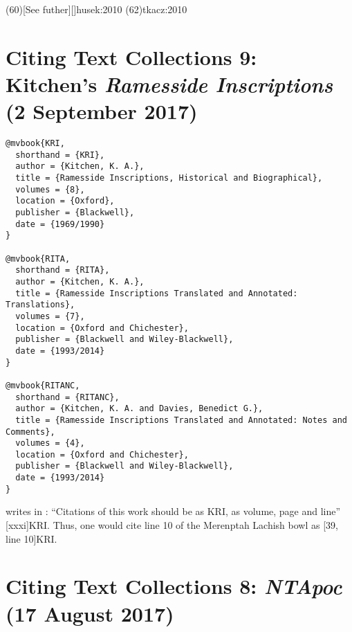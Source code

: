\documentclass[a4paper]{article}
\begin{document}
\examplecite(60)[See futher][]{husek:2010}
\examplecite(62){tkacz:2010}
\exampleabbreviations
\examplebibliography
{}

\section{Citing Text Collections 9: Kitchen’s \emph{Ramesside Inscriptions} (2 September 2017)}

\begin{verbatim}
@mvbook{KRI,
  shorthand = {KRI},
  author = {Kitchen, K. A.},
  title = {Ramesside Inscriptions, Historical and Biographical},
  volumes = {8},
  location = {Oxford},
  publisher = {Blackwell},
  date = {1969/1990}
}

@mvbook{RITA,
  shorthand = {RITA},
  author = {Kitchen, K. A.},
  title = {Ramesside Inscriptions Translated and Annotated: Translations},
  volumes = {7},
  location = {Oxford and Chichester},
  publisher = {Blackwell and Wiley-Blackwell},
  date = {1993/2014}
}

@mvbook{RITANC,
  shorthand = {RITANC},
  author = {Kitchen, K. A. and Davies, Benedict G.},
  title = {Ramesside Inscriptions Translated and Annotated: Notes and Comments},
  volumes = {4},
  location = {Oxford and Chichester},
  publisher = {Blackwell and Wiley-Blackwell},
  date = {1993/2014}
}
\end{verbatim}

\begin{verbcite}
   writes in : “Citations of this work
  should be as KRI, as volume, page and line” [xxxi]{KRI}. Thus,
  one would cite line 10 of the Merenptah Lachish bowl as [39, line
  10]{KRI}.
\end{verbcite}
\exampleabbreviations
{}

\section{Citing Text Collections 8: \emph{NTApoc} (17 August 2017)}
\end{document}
